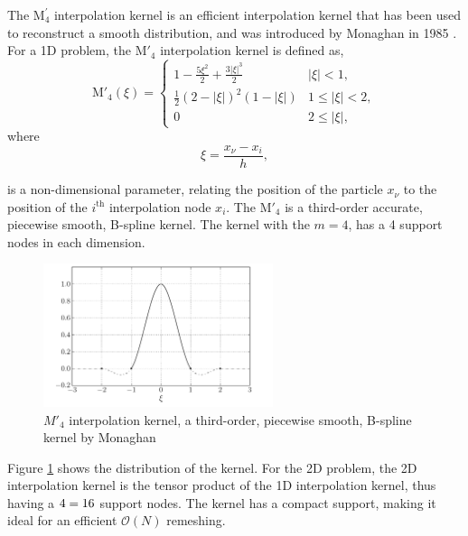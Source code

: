 The $\mathrm{M}^{\prime}_4$ interpolation kernel is an efficient interpolation kernel that has been used to reconstruct a smooth distribution, and was introduced by Monaghan in 1985 \cite{Monaghan1985}. For a 1D problem, the $\mathrm{M}'_4$ interpolation kernel is defined as,
	\begin{equation}
	{\mathrm{M'}_4}\left( {\xi} \right) =
	  \begin{cases}
	   {1 - \frac{{5{\xi ^2}}}{2} + \frac{{3{{\left| \xi  \right|}^3}}}{2}} & {\left| \xi \right|} < 1, \\
	   \frac{1}{2}{\left( {2 - \left| \xi  \right|} \right)^2}\left( {1 - \left| \xi  \right|} \right) & 1 \leqslant {\left| \xi \right|} < 2,\\
	   0 & 2 \leqslant \left| \xi \right|,
	  \end{cases}
	\label{eq:interpKernel}
	\end{equation}
where
	\begin{equation}
	\xi = \frac{x_{\nu} - x_i}{h},
	\label{eq:xiEquation}
	\end{equation}
	
is a non-dimensional parameter, relating the position of the particle $x_{\nu}$ to the position of the $i^{\mathrm{th}}$ interpolation node $x_i$. The $\mathrm{M'}_4$ is a third-order accurate, piecewise smooth, B-spline kernel. The kernel with the $m = 4$, has a 4 support nodes in each dimension. 

	\begin{figure}[H]
	\centering
	\includegraphics[width=0.6\textwidth]{figures/lagrangian/interpolationKernel.pdf}
	\caption{$M'_4$ interpolation kernel, a third-order, piecewise smooth, B-spline kernel by Monaghan \cite{Monaghan1985}}
	\label{fig:interpolationKernel}
	\end{figure}

Figure \ref{fig:interpolationKernel} shows the distribution of the kernel. For the 2D problem, the 2D interpolation kernel is the tensor product of the 1D interpolation kernel, thus having a $4\time4 = 16$ support nodes. The kernel has a compact support, making it ideal for an efficient $\mathcal{O}(N)$ remeshing.


